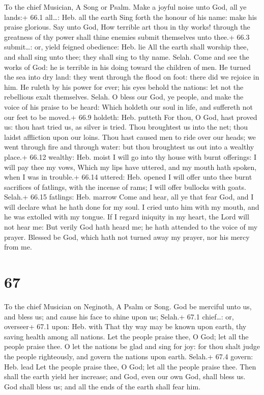 To the chief Musician, A Song or Psalm.  Make a joyful noise
unto God, all ye lands:+ 66.1 all\ldots: Heb. all the earth 
Sing forth the honour of his name: make his praise glorious.
 Say unto God, How terrible art thou in thy works! through
the greatness of thy power shall thine enemies submit themselves unto
thee.+ 66.3 submit\ldots: or, yield feigned obedience: Heb. lie
 All the earth shall worship thee, and shall sing unto thee;
they shall sing to thy name. Selah.  Come and see the works
of God: he is terrible in his doing toward the children of men.
 He turned the sea into dry land: they went through the
flood on foot: there did we rejoice in him.  He ruleth by
his power for ever; his eyes behold the nations: let not the rebellious
exalt themselves. Selah.  O bless our God, ye people, and
make the voice of his praise to be heard:  Which holdeth our
soul in life, and suffereth not our feet to be moved.+ 66.9 holdeth:
Heb. putteth  For thou, O God, hast proved us: thou hast
tried us, as silver is tried.  Thou broughtest us into the
net; thou laidst affliction upon our loins.  Thou hast
caused men to ride over our heads; we went through fire and through
water: but thou broughtest us out into a wealthy place.+ 66.12 wealthy:
Heb. moist  I will go into thy house with burnt offerings:
I will pay thee my vows,  Which my lips have uttered, and
my mouth hath spoken, when I was in trouble.+ 66.14 uttered: Heb. opened
 I will offer unto thee burnt sacrifices of fatlings, with
the incense of rams; I will offer bullocks with goats. Selah.+ 66.15
fatlings: Heb. marrow  Come and hear, all ye that fear God,
and I will declare what he hath done for my soul.  I cried
unto him with my mouth, and he was extolled with my tongue.
 If I regard iniquity in my heart, the Lord will not hear
me:  But verily God hath heard me; he hath attended to the
voice of my prayer.  Blessed be God, which hath not turned
away my prayer, nor his mercy from me.

\hypertarget{section-66}{%
\section{67}\label{section-66}}

To the chief Musician on Neginoth, A Psalm or Song.  God be
merciful unto us, and bless us; and cause his face to shine upon us;
Selah.+ 67.1 chief\ldots: or, overseer+ 67.1 upon: Heb. with
 That thy way may be known upon earth, thy saving health
among all nations.  Let the people praise thee, O God; let
all the people praise thee.  O let the nations be glad and
sing for joy: for thou shalt judge the people righteously, and govern
the nations upon earth. Selah.+ 67.4 govern: Heb. lead  Let
the people praise thee, O God; let all the people praise thee.
 Then shall the earth yield her increase; and God, even our
own God, shall bless us.  God shall bless us; and all the
ends of the earth shall fear him.

